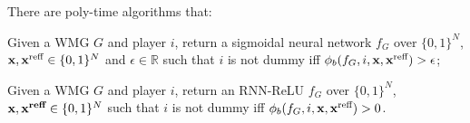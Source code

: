 \begin{proposition} \label{prop:reductionsigmoid} 

There are poly-time algorithms that: \begin{inparaenum}[(i)] \item Given a WMG $G$ and player $i$, return a sigmoidal neural network $f_{G}$ over $\{0,1\}^{N}$, $\textbf{x},\textbf{x}^{\text{reff}} \in \{0,1\}^{N}$ and $\epsilon \in \mathbb{R}$ such that $i$ is not dummy iff $\phi_{b}(f_{G},i,\textbf{x},\textbf{x}^{\text{reff}}) > \epsilon$; \item Given a WMG $G$ and player $i$, return an RNN-ReLU $f_{G}$ over $\{0,1\}^{N}$, $\textbf{x},\textbf{x}^{\textbf{reff}} \in \{0,1\}^{N}$ such that $i$ is not dummy iff $\phi_{b}(f_{G},i,\textbf{x},\textbf{x}^{\text{reff}}) > 0$. \end{inparaenum}









\end{proposition}

